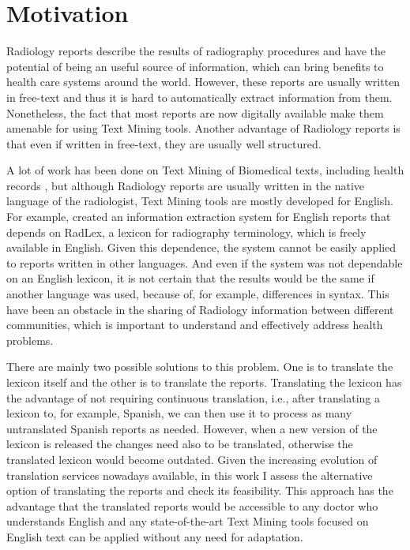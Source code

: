 \label{chap1}

\section{Motivation}
\label{motivation}

Radiology reports describe the results of radiography procedures and have the potential of being an useful source of information, which can bring benefits to health care systems around the world. However, these reports are usually written in free-text and thus it is hard to automatically extract information from them. Nonetheless, the fact that most reports are now digitally available make them amenable for using Text Mining tools. Another advantage of Radiology reports is that even if written in free-text, they are usually well structured.

A lot of work has been done on Text Mining of Biomedical texts, including health records \citep{Pons2016}, but although Radiology reports are usually written in the native language of the radiologist, Text Mining tools are mostly developed for English. For example, \citep{Hassanpour2016} created an information extraction system for English reports that depends on RadLex, a lexicon for radiography terminology, which is freely available in English. Given this dependence, the system cannot be easily applied to reports written in other languages. And even if the system was not dependable on an English lexicon, it is not certain that the results would be the same if another language was used, because of, for example, differences in syntax. This have been an obstacle in the sharing of Radiology information between different communities, which is important to understand and effectively address health problems.

There are mainly two possible solutions to this problem. One is to translate the lexicon itself \citep{Bretschneider} and the other is to translate the reports. Translating the lexicon has the advantage of not requiring continuous translation, i.e., after translating a lexicon to, for example, Spanish, we can then use it to process as many untranslated Spanish reports as needed. However, when a new version of the lexicon is released the changes need also to be translated, otherwise the translated lexicon would become outdated. Given the increasing evolution of translation services nowadays available, in this work I assess the alternative option of translating the reports and check its feasibility. This approach has the advantage that the translated reports would be accessible to any doctor who understands English and any state-of-the-art Text Mining tools focused on English text can be applied without any need for adaptation. 

